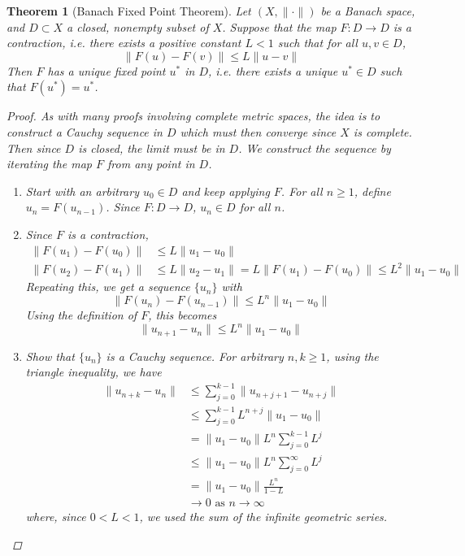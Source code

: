 \documentclass[12pt]{amsart}         %
\newtheorem{theorem}{Theorem}[section]
\theoremstyle{remark}
\begin{document}
\begin{theorem}[Banach Fixed Point Theorem] Let $(X, \|\cdot\|)$ be a Banach space, and $D \subset X$ a closed, nonempty subset of $X$. Suppose that the map $F: D \rightarrow D$ is a contraction, i.e. there exists a positive constant $L < 1$ such that for all $u, v \in D$,
\[
\|F(u) - F(v)\| \leq L\|u - v\|
\]
Then $F$ has a unique fixed point $u^*$ in $D$, i.e. there exists a unique $u^* \in D$ such that $F(u^*) = u^*$.

\begin{proof}
As with many proofs involving complete metric spaces, the idea is to construct a Cauchy sequence in $D$ which must then converge since $X$ is complete. Then since $D$ is closed, the limit must be in $D$. We construct the sequence by iterating the map $F$ from any point in $D$.

\begin{enumerate}
	\item Start with an arbitrary $u_0 \in D$ and keep applying $F$. For all $n \geq 1$, define $u_n = F(u_{n-1})$. Since $F: D \rightarrow D$, $u_n \in D$ for all $n$.
	
	\item Since $F$ is a contraction,
	\begin{align*}
	\|F(u_1) - F(u_0)\| &\leq L \|u_1 - u_0\| \\
	\|F(u_2) - F(u_1)\| &\leq L \|u_2 - u_1\| = L\|F(u_1) - F(u_0)\| \leq L^2 \|u_1 - u_0\|
	\end{align*}
	Repeating this, we get a sequence $\{u_n\}$ with
	\[
	\|F(u_n) - F(u_{n-1})\| \leq L^n \|u_1 - u_0\|
	\]
	Using the definition of $F$, this becomes
	\[
	\|u_{n+1} - u_n \| \leq L^n \|u_1 - u_0\|
	\]
	
	\item Show that $\{ u_n \}$ is a Cauchy sequence. For arbitrary $n, k \geq 1$, using the triangle inequality, we have
	\begin{align*}
	\|u_{n+k} - u_n\| &\leq \sum_{j=0}^{k-1} \| u_{n+j+1} - u_{n+j}\| \\
	&\leq \sum_{j=0}^{k-1} L^{n+j} \|u_1 - u_0\| \\
	&= \|u_1 - u_0\| L^n \sum_{j=0}^{k-1} L^j \\
	&\leq \|u_1 - u_0\| L^n \sum_{j=0}^{\infty} L^j \\
	&= \|u_1 - u_0\| \frac{L^n}{1 - L} \\
	&\rightarrow 0 \text{ as }n \rightarrow \infty
	\end{align*}
	where, since $0 < L < 1$, we used the sum of the infinite geometric series.
	

\end{enumerate}
\end{proof}
\end{theorem}
\end{document}
